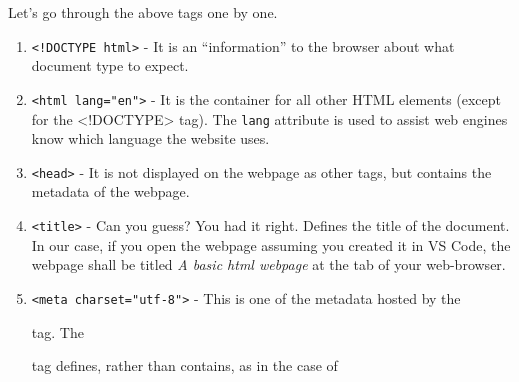 \documentclass[
]{book}
\theoremstyle{definition}
\theoremstyle{definition}
\theoremstyle{definition}
\theoremstyle{definition}
\theoremstyle{remark}
\begin{document}
Let's go through the above tags one by one.

\begin{enumerate}
\def\labelenumi{\arabic{enumi}.}
\item
  \texttt{\textless{}!DOCTYPE\ html\textgreater{}} - It is an ``information'' to the browser about what document type to expect.
\item
  \texttt{\textless{}html\ lang="en"\textgreater{}} - It is the container for all other HTML elements (except for the \textless!DOCTYPE\textgreater{} tag). The \texttt{lang} attribute is used to assist web engines know which language the website uses.
\item
  \texttt{\textless{}head\textgreater{}} - It is not displayed on the webpage as other tags, but contains the metadata of the webpage.
\item
  \texttt{\textless{}title\textgreater{}} - Can you guess? You had it right. Defines the title of the document. In our case, if you open the webpage assuming you created it in VS Code, the webpage shall be titled \emph{A basic html webpage} at the tab of your web-browser.
\item
  \texttt{\textless{}meta\ charset="utf-8"\textgreater{}} - This is one of the metadata hosted by the

  tag. The

  tag defines, rather than contains, as in the case of


\end{enumerate}
\end{document}

